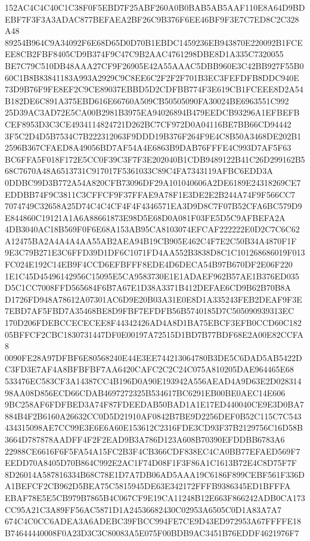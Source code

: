 \documentclass[UTF8,fontset=fandol,zihao=-4,a4paper]{ctexart}
\begin{document}
{{152AC4C4C40C1C38F0F5EBD7F25ABF260A0B0BAB5AB5AAF110E8A64D9BDEBF7F3F3A3ADAC877BEFAEA2BF26C9B376F6EE46BF9F3E7C7ED8C2C328A48
89254B964C9A34092F6E68D65D0D70B1EBDC1459236EB943870E220092B1FCEEE8CB2FBF8405CD9B374F9C47C9B2AAC4761298DBE8D1A335C7320055
BE7C79C510DB48AAA27CF9F26905E42A55AAAC5DBB960E3C42BB927F55B060C1B8B83841183A993A2929C9C8EE6C2F2F2F701B3EC3FEFDFB8DDC940E
73D9B76F9FE8EF2C9CE89037EBBD5D2CDFBB774F3E619CB1FCEEE8D2A54B182DE6C891A375EBD616E66760A509CB50505090FA30024BE6963551C992
25D39AC3AD72E5CA00B2981B3975EA94026894B479EEDCB93296A1EFBEFBCEF8953D3C3CE4934114824721D262BC7CF972D0A04116BE7BB66CD94442
3F5C2D4D5B7534C7B222312063F9DDD19B376F264F9E4C8B50A3468DE202B12596B367CFAED8A49056BD7AF54A4E6863B9DAB76FFFE4C993D7AF5F63
BC6FFA5F018F172E5CC0F39C3F7F3E202040B1CDB9489122B41C26D299162B568C7670A48A6513731C917017F5361033C89C4FA7343119AFBC6EDD3A
0DDBC99D3B772A54A820CFB73096DF29A101040606A2DE6189E24318269CE7EDDBB74F9C3811C3CFFCF9F37FFAE9A78F1E3DE2E2B244A74F9F566CC7
7074749C32658A25D74C4C4CF4F4F4346571EA3D9D8C7F07B52CFA6BC579D9E844860C19121A1A6A88661873E98D5E68D0A081F03FE5D5C9AFBEFA2A
4DB3040AC18B569F0F6E68A153AB95CA8103074EFCAF222222E0D2C7C6C62A12475BA2A4A4A4AA55AB2AEA94B19CB905E462C4F7E2C50B34A4870F1F
9E3C79B271E3C6FFD39D1DF6C1071FD4AA552B3838D8C1C101268686019F013FC024E192C14EB9F4CCD6EFBFFF8EDE4D6DECA54B97B670DF2E06F220
1E1C45D45496142956C15095E5CA9583730E1E1ADAEF962B57AE1B376ED035D5C1CC7008FFD565684F6B7A67E1D38A3371B412DEFAE6CD9B62B70B8A
D1726FD948A78612A07301AC6D9E20B03A31E0E8D1A335243FEB2DEAF9F3E7EBD7AF5FBD7A35468BE8D9FBF7EFDFB56B5740185D7C505090939313EC
170D206FDEBCCECECEE8F44342426AD4A8D1BA75EBCF3EFB0CCD60C18205BFFCF2CBC1830731447DF0E00197A72515D1BD7B77BDF68E2A00E82CCFA8
0090FE28A97DFBF6E80568240E44E3EE744213064780B3DE5C6DAD5AB5422DC3FD3E7AF4A8BFBFBF7AA6420CAFC2C2C24C075A810205DAE964465E68
533476EC583CF3A14387CC4B196D0A90E193942A556AEAD4A9D63E2D02831498AA08D856ECD66CDAB4697272325B534617BC6291EB00BE0AEC14E606
9BC258AF6FDFBED3A74F87FDEEDAB50BAD1A1E17ED440040CE9E3D0BA7884B4F2B6160A26632CC0D5D21910AF0842B7BE9D2256DEF0B52C115C7C543
434315098AE7CC99E3E6E6A60E153612C2316FDE3CD93F37B2129756C16D58B3664D787878AADFF4F2F2EAD9B3A786D123A608B70390EFDDBB6783A6
22988CE6616F6F5FA54A15FC2B3F4CB366CDF838EC4CA0BB77EFAED569F7EEDD70A8405D70B864C992E2AC1F74D08F1F3F86A1C1613B72E4C8D75F7F
8D26014A587816334B68C78E1D7A7DB06AD5AAA19C6186F899CEBF561F336DA1BEFCF2CB962D5BEA75C5815945DE63E342172FFFB9386345ED1BFFFA
EBAF78E5E5CB979B7865B4C067CF9E19CA11248B12E663F866242ADB0CA173CC95A21C3A89FF56AC5871D1A24536682430C02953A6505C0D1A83A7A7
674C4C0CC6ADEA3A6ADEBC39FBCC994FE7CE9D43ED972953A67FFFFE18B74644440008F0A23D3C3C80083A5E075F00BDB9AC3451B76EDDF4621976F7
}}
\end{document}
